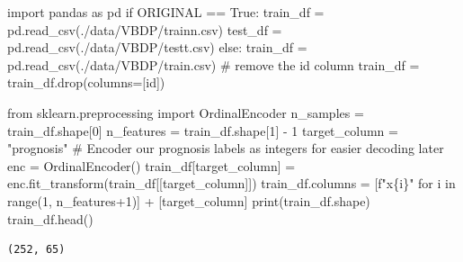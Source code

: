 \documentclass[
  letterpaper,
  DIV=11,
  numbers=noendperiod]{scrreprt}
\newenvironment{Shaded}{\begin{snugshade}}{\end{snugshade}}
\newcommand{\BuiltInTok}[1]{\textcolor[rgb]{0.00,0.23,0.31}{#1}}
\newcommand{\CommentTok}[1]{\textcolor[rgb]{0.37,0.37,0.37}{#1}}
\newcommand{\ControlFlowTok}[1]{\textcolor[rgb]{0.00,0.23,0.31}{#1}}
\newcommand{\DecValTok}[1]{\textcolor[rgb]{0.68,0.00,0.00}{#1}}
\newcommand{\ImportTok}[1]{\textcolor[rgb]{0.00,0.46,0.62}{#1}}
\newcommand{\KeywordTok}[1]{\textcolor[rgb]{0.00,0.23,0.31}{#1}}
\newcommand{\NormalTok}[1]{\textcolor[rgb]{0.00,0.23,0.31}{#1}}
\newcommand{\OperatorTok}[1]{\textcolor[rgb]{0.37,0.37,0.37}{#1}}
\newcommand{\SpecialCharTok}[1]{\textcolor[rgb]{0.37,0.37,0.37}{#1}}
\newcommand{\SpecialStringTok}[1]{\textcolor[rgb]{0.13,0.47,0.30}{#1}}
\newcommand{\StringTok}[1]{\textcolor[rgb]{0.13,0.47,0.30}{#1}}
\newcommand{\VariableTok}[1]{\textcolor[rgb]{0.07,0.07,0.07}{#1}}
\begin{document}
\begin{Shaded}
\begin{Highlighting}[]
\ImportTok{import}\NormalTok{ pandas }\ImportTok{as}\NormalTok{ pd}
\ControlFlowTok{if}\NormalTok{ ORIGINAL }\OperatorTok{==} \VariableTok{True}\NormalTok{:}
\NormalTok{    train\_df }\OperatorTok{=}\NormalTok{ pd.read\_csv(}\StringTok{\textquotesingle{}./data/VBDP/trainn.csv\textquotesingle{}}\NormalTok{)}
\NormalTok{    test\_df }\OperatorTok{=}\NormalTok{ pd.read\_csv(}\StringTok{\textquotesingle{}./data/VBDP/testt.csv\textquotesingle{}}\NormalTok{)}
\ControlFlowTok{else}\NormalTok{:}
\NormalTok{    train\_df }\OperatorTok{=}\NormalTok{ pd.read\_csv(}\StringTok{\textquotesingle{}./data/VBDP/train.csv\textquotesingle{}}\NormalTok{)}
    \CommentTok{\# remove the id column}
\NormalTok{    train\_df }\OperatorTok{=}\NormalTok{ train\_df.drop(columns}\OperatorTok{=}\NormalTok{[}\StringTok{\textquotesingle{}id\textquotesingle{}}\NormalTok{])}
\end{Highlighting}
\end{Shaded}

\begin{Shaded}
\begin{Highlighting}[]
\ImportTok{from}\NormalTok{ sklearn.preprocessing }\ImportTok{import}\NormalTok{ OrdinalEncoder}
\NormalTok{n\_samples }\OperatorTok{=}\NormalTok{ train\_df.shape[}\DecValTok{0}\NormalTok{]}
\NormalTok{n\_features }\OperatorTok{=}\NormalTok{ train\_df.shape[}\DecValTok{1}\NormalTok{] }\OperatorTok{{-}} \DecValTok{1}
\NormalTok{target\_column }\OperatorTok{=} \StringTok{"prognosis"}
\CommentTok{\# Encoder our prognosis labels as integers for easier decoding later}
\NormalTok{enc }\OperatorTok{=}\NormalTok{ OrdinalEncoder()}
\NormalTok{train\_df[target\_column] }\OperatorTok{=}\NormalTok{ enc.fit\_transform(train\_df[[target\_column]])}
\NormalTok{train\_df.columns }\OperatorTok{=}\NormalTok{ [}\SpecialStringTok{f"x}\SpecialCharTok{\{}\NormalTok{i}\SpecialCharTok{\}}\SpecialStringTok{"} \ControlFlowTok{for}\NormalTok{ i }\KeywordTok{in} \BuiltInTok{range}\NormalTok{(}\DecValTok{1}\NormalTok{, n\_features}\OperatorTok{+}\DecValTok{1}\NormalTok{)] }\OperatorTok{+}\NormalTok{ [target\_column]}
\BuiltInTok{print}\NormalTok{(train\_df.shape)}
\NormalTok{train\_df.head()}
\end{Highlighting}
\end{Shaded}

\begin{verbatim}
(252, 65)
\end{verbatim}
\end{document}
